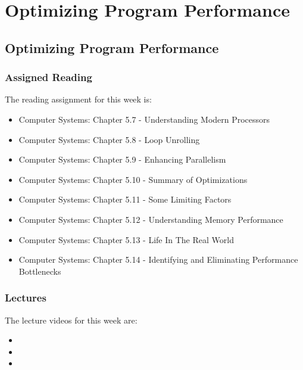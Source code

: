 \clearpage

\renewcommand{\ChapTitle}{Optimizing Program Performance}
\renewcommand{\SectionTitle}{Optimizing Program Performance}

\chapter{\ChapTitle}
\section{\SectionTitle}

\subsection{Assigned Reading}

The reading assignment for this week is:

\begin{itemize}
    \item Computer Systems: Chapter 5.7 - Understanding Modern Processors
    \item Computer Systems: Chapter 5.8 - Loop Unrolling
    \item Computer Systems: Chapter 5.9 - Enhancing Parallelism
    \item Computer Systems: Chapter 5.10 - Summary of Optimizations
    \item Computer Systems: Chapter 5.11 - Some Limiting Factors
    \item Computer Systems: Chapter 5.12 - Understanding Memory Performance
    \item Computer Systems: Chapter 5.13 - Life In The Real World
    \item Computer Systems: Chapter 5.14 - Identifying and Eliminating Performance Bottlenecks
\end{itemize}

\subsection{Lectures}

The lecture videos for this week are:

\begin{itemize}
    \item {}
    \item {}
    \item {}
\end{itemize}

